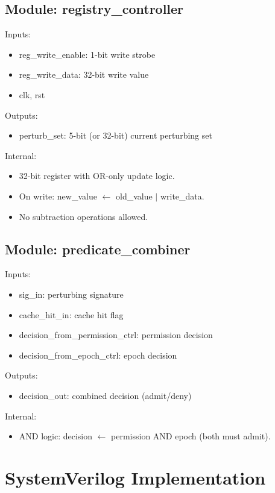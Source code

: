 \documentclass[11pt,oneside]{article}
\begin{document}
\subsection{Module: registry\_controller}

Inputs:
\begin{itemize}
\item reg\_write\_enable: 1-bit write strobe
\item reg\_write\_data: 32-bit write value
\item clk, rst
\end{itemize}

Outputs:
\begin{itemize}
\item perturb\_set: 5-bit (or 32-bit) current perturbing set
\end{itemize}

Internal:
\begin{itemize}
\item 32-bit register with OR-only update logic.
\item On write: new\_value $\gets$ old\_value $|$ write\_data.
\item No subtraction operations allowed.
\end{itemize}

\subsection{Module: predicate\_combiner}

Inputs:
\begin{itemize}
\item sig\_in: perturbing signature
\item cache\_hit\_in: cache hit flag
\item decision\_from\_permission\_ctrl: permission decision
\item decision\_from\_epoch\_ctrl: epoch decision
\end{itemize}

Outputs:
\begin{itemize}
\item decision\_out: combined decision (admit/deny)
\end{itemize}

Internal:
\begin{itemize}
\item AND logic: decision $\gets$ permission AND epoch (both must admit).
\end{itemize}

\section{SystemVerilog Implementation}
\end{document}
